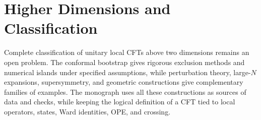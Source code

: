 \section{Higher Dimensions and Classification}

Complete classification of unitary local CFTs above two dimensions remains an open problem.
The conformal bootstrap gives rigorous exclusion methods and numerical
islands under specified assumptions, while perturbation theory, large-\(N\)
expansions, supersymmetry, and geometric constructions give complementary
families of examples.  The monograph uses all these constructions as sources
of data and checks, while keeping the logical definition of a CFT tied to
local operators, states, Ward identities, OPE, and crossing.
